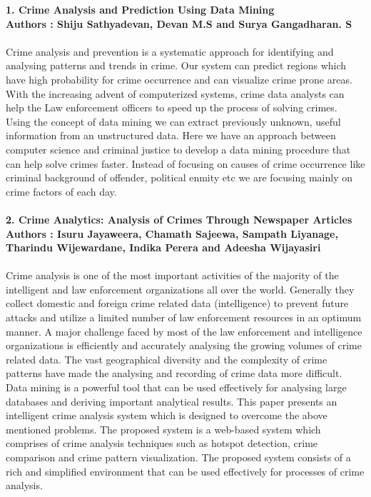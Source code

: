 \documentclass[12pt]{extreport}
\begin{document}
\textbf{1. Crime Analysis and Prediction Using Data Mining}\\
\textbf{Authors : Shiju Sathyadevan, Devan M.S and Surya Gangadharan. S}\\\\
Crime analysis and prevention is a systematic approach for identifying and analysing patterns and trends in crime. Our system can predict regions which have high probability for crime occurrence and can visualize crime prone areas. With the increasing advent of computerized systems, crime data analysts can help the Law enforcement officers to speed up the process of solving crimes. Using the concept of data mining we can extract previously unknown, useful information from an unstructured data. Here we have an approach between computer science and criminal justice to develop a data mining procedure that can help solve crimes faster. Instead of focusing on causes of crime occurrence like criminal background of offender, political enmity etc we are focusing mainly on crime factors of each day.\\\\
\textbf{2. Crime Analytics: Analysis of Crimes Through Newspaper Articles}\\
\textbf{Authors : Isuru Jayaweera, Chamath Sajeewa, Sampath Liyanage, Tharindu Wijewardane, Indika Perera and Adeesha Wijayasiri }\\\\
Crime analysis is one of the most important activities of the majority of the intelligent and law enforcement organizations all over the world. Generally they collect domestic and foreign crime related data (intelligence) to prevent future attacks and utilize a limited number of law enforcement resources in an optimum manner. A major challenge faced by most of the law enforcement and intelligence organizations is efficiently and accurately analysing the growing volumes of crime related data. The vast geographical diversity and the complexity of crime patterns have made the analysing and recording of crime data more difficult. Data mining is a powerful tool that can be used effectively for analysing large databases and deriving important analytical results. This paper presents an intelligent crime analysis system which is designed to overcome the above mentioned problems. The proposed system is a web-based system which comprises of crime analysis techniques such as hotspot detection, crime comparison and crime pattern visualization. The proposed system consists of a rich and simplified environment that can be used effectively for processes of crime analysis.\\\\
\end{document}
